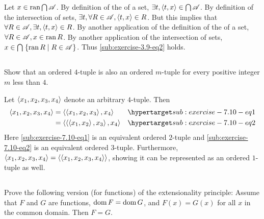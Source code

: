 \documentclass{report}
\begin{document}
\begin{answer}
      Let $x \in \mathop{\text{ran}}{\bigcap{\mathscr{A}}}$.
      By definition of the  of a set,
        $\exists t, \left< t, x \right> \in \bigcap{\mathscr{A}}$.
      By definition of the intersection of sets,
        $\exists t, \forall R \in \mathscr{A}, \left< t, x \right> \in R$.
      But this implies that
        $\forall R \in \mathscr{A}, \exists t, \left< t, x \right> \in R$.
      By another application of the definition of the  of a
        set, $\forall R \in \mathscr{A}, x \in \mathop{\text{ran}}{R}$.
      By another application of the intersection of sets,
        $x \in \bigcap\;\{ \mathop{\text{ran}}{R} \mid R \in \mathscr{A} \}$.
        Thus \eqref{sub:exercise-3.9-eq2} holds.

  \end{answer}

\subsection{}%

  Show that an ordered $4$-tuple is also an ordered $m$-tuple for every positive
    integer $m$ less than $4$.

  \begin{answer}
    Let $\left< x_1, x_2, x_3, x_4 \right>$ denote an arbitrary $4$-tuple.
    Then
      \begin{align}
        \tuple{x_1, x_2, x_3, x_4}
          & = \tuple{\tuple{x_1, x_2, x_3}, x_4}
            & \hyperlabel{sub:exercise-7.10-eq1} \\
          & = \tuple{\tuple{\tuple{x_1, x_2}, x_3}, x_4}
            & \hyperlabel{sub:exercise-7.10-eq2}
      \end{align}
    Here \eqref{sub:exercise-7.10-eq1} is an equivalent ordered $2$-tuple and
      \eqref{sub:exercise-7.10-eq2} is an equivalent ordered $3$-tuple.
    Furthermore,
      $\left< x_1, x_2, x_3, x_4 \right> = \left< \left< x_1, x_2, x_3, x_4 \right> \right>$,
      showing it can be represented as an ordered $1$-tuple as well.
  \end{answer}

\subsection{}%

  Prove the following version (for functions) of the extensionality principle:
    Assume that $F$ and $G$ are functions, $\mathop{\text{dom}}{F} = \mathop{\text{dom}}{G}$, and
    $F(x) = G(x)$ for all $x$ in the common domain.
  Then $F = G$.
\end{document}

